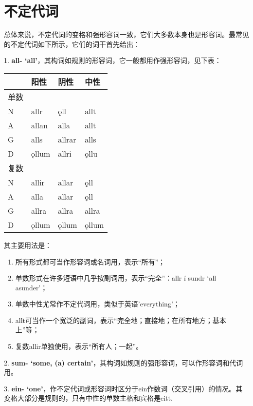 \section{不定代词}\label{不定代词}

总体来说，不定代词的变格和强形容词一致，它们大多数本身也是形容词。最常见的不定代词如下所示，它们的词干首先给出：

1. \textbf{all-
  `all‌'}，其构词如规则的形容词，它一般都用作强形容词，见下表：

\begin{longtable}{llll}
  \toprule
       & 阳性  & 阴性   & 中性  \\
  \midrule
  \endhead
  \bottomrule
  \endfoot
  单数 &       &        &       \\
  N    & allr  & ǫll    & allt  \\
  A    & allan & alla   & allt  \\
  G    & alls  & allrar & alls  \\
  D    & ǫllum & allri  & ǫllu  \\
  复数 &       &        &       \\
  N    & allir & allar  & ǫll   \\
  A    & alla  & allar  & ǫll   \\
  G    & allra & allra  & allra \\
  D    & ǫllum & ǫllum  & ǫllum \\
\end{longtable}

其主要用法是：

\begin{enumerate}
  \def\labelenumi{\Alph{enumi}.}
  \item
        所有形式都可当作形容词或名词用，表示``所有''；
  \item
        单数形式在许多短语中几乎按副词用，表示``完全''：allr í sundr `all
        asunder'；
  \item
        单数中性尤常作不定代词用，类似于英语'everything'；
  \item
        allt可当作一个宽泛的副词，表示``完全地；直接地；在所有地方；基本上''等；
  \item
        复数allir单独使用，表示``所有人；一起''。
\end{enumerate}

2. \textbf{sum- `some, (a)
  certain‌'}，其构词如规则的强形容词，可以作形容词和代词用。

3. \textbf{ein-
  `one‌'}，作不定代词或形容词时区分于ein作数词（交叉引用）的情况。其变格大部分是规则的，只有中性的单数主格和宾格是eitt.

